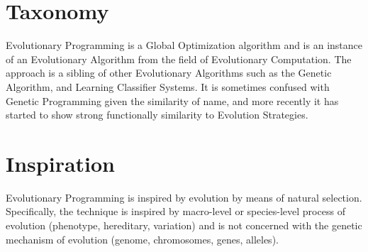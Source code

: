 \documentclass[a4paper, 11pt]{article}
\begin{document}
\section{Taxonomy}
\label{sec:taxonomy}
Evolutionary Programming is a Global Optimization algorithm and is an instance of an Evolutionary Algorithm from the field of Evolutionary Computation.
The approach is a sibling of other Evolutionary Algorithms such as the Genetic Algorithm, and Learning Classifier Systems. It is sometimes confused with Genetic Programming given the similarity of name, and more recently it has started to show strong functionally similarity to Evolution Strategies. 

\section{Inspiration}
\label{sec:inspiration}
Evolutionary Programming is inspired by evolution by means of natural selection.
Specifically, the technique is inspired by macro-level or species-level process of evolution (phenotype, hereditary, variation) and is not concerned with the genetic mechanism of evolution (genome, chromosomes, genes, alleles).
\end{document}
